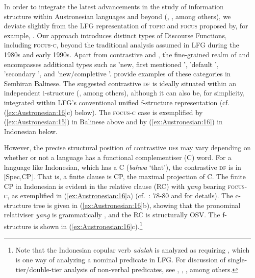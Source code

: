 \documentclass[output=paper,chinesefont]{../langscibook}
\begin{document}
In order to integrate the latest advancements in the study of information structure within Austronesian languages \citep{Riesberg2018} and beyond (\citealt{DN}, , among others), we deviate slightly from the LFG representation of \textsc{topic} and \textsc{focus} proposed by, for example, \citet{BM87}. Our approach introduces distinct types of Discourse Functions, including \textsc{focus-c}, beyond the traditional analysis assumed in LFG during the 1980s and early 1990s. Apart from contrastive \TOPIC and \FOCUS, the fine-grained realm of \TOPIC and \FOCUS encompasses additional types such as 'new, first mentioned \TOPIC', 'default \TOPIC', 'secondary \TOPIC', and 'new/completive \FOCUS'. \citet{Arka2018} provide examples of these categories in Sembiran Balinese. The suggested contrastive \textsc{df} is ideally situated within an independent i-structure (\citealt{King1997,A07,Butt14}, among others), although it can also be, for simplicity,  integrated within LFG's conventional unified f-structure representation (cf. (\ref{ex:Austronesian:16}c) below). The \textsc{focus-c} case is exemplified by (\ref{ex:Austronesian:15}) in Balinese above and by (\ref{ex:Austronesian:16}) in Indonesian below.

However, the precise structural position of contrastive \textsc{df}s may vary depending on whether or not a language has a functional complementiser (C) word. For a language like Indonesian, which has a C (\emph{bahwa} `that'), the contrastive \textsc{df} is in [Spec,CP]. That is, a finite clause is CP, the maximal projection of C. The finite CP in Indonesian is evident in the relative clause (RC) with \emph{yang} bearing \mbox{\textsc{focus-c}}, as exemplified in (\ref{ex:Austronesian:16}a) (cf.\ \citealt{Arka2011}: 78-80 and \citet{Arka2021} for details). The c-structure tree is given in (\ref{ex:Austronesian:16}b), showing that the pronominal relativiser \emph{yang} is grammatically \OBJ, and the RC is structurally OSV.  The f-structure is shown in (\ref{ex:Austronesian:16}c).\footnote{Note that the Indonesian copular verb \emph{adalah} is analyzed as requiring \PREDLINK, which is one way of analyzing a nominal predicate in LFG. For discussion of single-tier/double-tier analysis of non-verbal predicates, see \citet{Andrews82}, \citet{ButtEtAl1999}, \citet{dalrympleetal04copular}, among others.}
\end{document}
